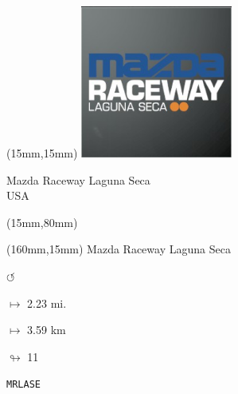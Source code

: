 \begin{textblock*}{50mm}(15mm,15mm)%
\includegraphics[width=50mm]{LG/2015-05-20_00085.png}
\par Mazda Raceway Laguna Seca\\ USA
\end{textblock*}
\begin{textblock*}{185mm}(15mm,80mm)%
\end{textblock*}
\begin{textblock*}{40mm}(160mm,15mm)%
Mazda Raceway Laguna Seca
\par \Huge$\circlearrowleft$
\Large
\par$\mapsto$ 2.23 mi.
\par$\mapsto$ 3.59 km
\par$\looparrowright$ 11
\par\hfill\tiny\tt MRLASE\\
\end{textblock*}
\null\newpage

